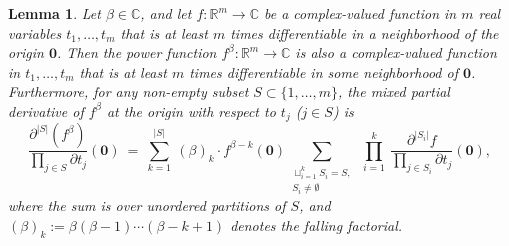 \documentclass[10pt,a4paper]{amsart}
\newtheorem{lemma}{Lemma}
\begin{document}
\begin{lemma}\label{lemma:power-rule}
Let $\beta \in \mathbb{C}$, and let $f:\mathbb{R}^m\to\mathbb{C}$ be a complex-valued function in $m$ real variables $t_1,\dots,t_m$ that is at least $m$ times differentiable in a neighborhood of the origin $\mathbf{0}$. Then the power function $f^\beta:\mathbb{R}^m\to\mathbb{C}$ is also a complex-valued function in $t_1,\dots,t_m$ that is at least $m$ times differentiable in some neighborhood of $\mathbf{0}$. Furthermore, for any non-empty subset $S \subset \{1, \dots, m\}$, the mixed partial derivative of $f^\beta$ at the origin with respect to $t_j$ ($j\in S$) is 
\begin{equation}\label{eq:power-rule}
\frac{\partial^{|S|}(f^\beta)}{\prod_{j \in S}\partial t_j}(\mathbf{0}) \ = \ \sum_{k=1}^{|S|} \ (\beta)_k \cdot f^{\beta-k}(\mathbf{0})\sum_{\substack{\sqcup_{i=1}^k S_i = S, \\ S_i \neq \emptyset}} \ \prod_{i=1}^k \ \frac{\partial^{|S_i|}f}{\prod_{j\in S_i}\partial t_j}(\mathbf{0}),
\end{equation}
where the sum is over unordered partitions of $S$, and $(\beta)_k:=\beta(\beta-1)\cdots(\beta-k+1)$ denotes the falling factorial. 
\end{lemma} 
\end{document}
